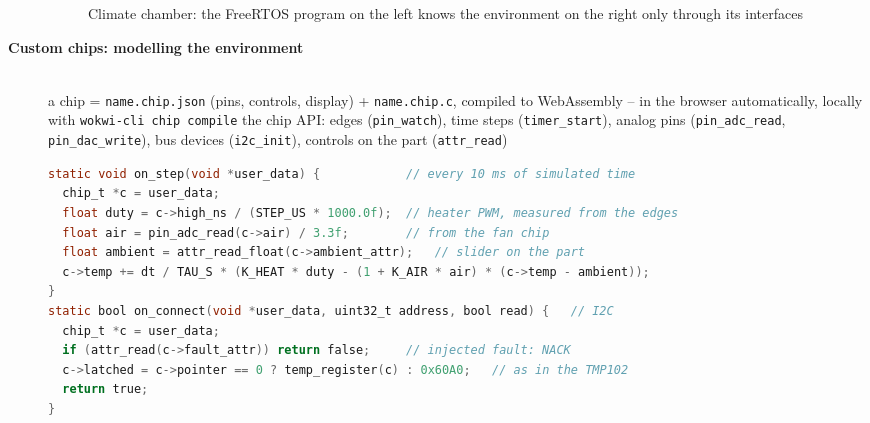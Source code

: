 \begin{description}
\begin{figure}[!hbtp]
\begin{center}
{}
\caption{Climate chamber: the FreeRTOS program on the left knows the environment on the right only through its interfaces}
\end{center}
\end{figure}
\os{\newpage}

\item[{\rot\bf Custom chips: modelling the environment}]~\\[-\lblskip]
\bi
	\ite a chip = \texttt{name.chip.json} (pins, controls, display) + \texttt{name.chip.c}, compiled to WebAssembly -- in the browser automatically, locally with \texttt{wokwi-cli chip compile}
	\ite the chip API: edges (\texttt{pin\_watch}), time steps (\texttt{timer\_start}), analog pins (\texttt{pin\_adc\_read}, \texttt{pin\_dac\_write}), bus devices (\texttt{i2c\_init}), controls on the part (\texttt{attr\_read})
\ei
\begin{lstlisting}[language=C]
static void on_step(void *user_data) {            // every 10 ms of simulated time
  chip_t *c = user_data;
  float duty = c->high_ns / (STEP_US * 1000.0f);  // heater PWM, measured from the edges
  float air = pin_adc_read(c->air) / 3.3f;        // from the fan chip
  float ambient = attr_read_float(c->ambient_attr);   // slider on the part
  c->temp += dt / TAU_S * (K_HEAT * duty - (1 + K_AIR * air) * (c->temp - ambient));
}
static bool on_connect(void *user_data, uint32_t address, bool read) {   // I2C
  chip_t *c = user_data;
  if (attr_read(c->fault_attr)) return false;     // injected fault: NACK
  c->latched = c->pointer == 0 ? temp_register(c) : 0x60A0;   // as in the TMP102
  return true;
}
\end{lstlisting}
\os{\newpage}


\end{description}
